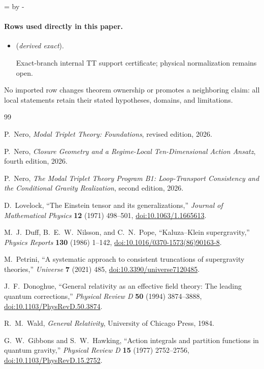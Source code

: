 \documentclass[11pt,a4paper]{article}
\theoremstyle{definition}
\theoremstyle{remark}
\begin{document}
\par\begingroup{}=\pagegoal\advance{} by -\pagetotal\ifdim\dimen0<7\baselineskip\newpage\fi\endgroup
\paragraph{Rows used directly in this paper.}
\begin{itemize}
\setlength{\itemsep}{0.25em}
\item {} (\emph{derived exact}).\par Exact-branch internal TT support certificate; physical normalization remains open.
\end{itemize}

No imported row changes theorem ownership or promotes a neighboring claim: all local statements retain their stated hypotheses, domains, and limitations.

\begin{thebibliography}{99}

P.~Nero,
\emph{Modal Triplet Theory: Foundations},
revised edition, 2026.

P.~Nero,
\emph{Closure Geometry and a Regime-Local Ten-Dimensional Action Ansatz},
fourth edition, 2026.

P.~Nero,
\emph{The Modal Triplet Theory Program B1: Loop-Transport Consistency and
the Conditional Gravity Realization},
second edition, 2026.

D.~Lovelock,
``The Einstein tensor and its generalizations,''
\emph{Journal of Mathematical Physics} \textbf{12} (1971) 498--501,
\href{https://doi.org/10.1063/1.1665613}
{doi:10.1063/1.1665613}.

M.~J.~Duff, B.~E.~W.~Nilsson, and C.~N.~Pope,
``Kaluza--Klein supergravity,''
\emph{Physics Reports} \textbf{130} (1986) 1--142,
\href{https://doi.org/10.1016/0370-1573(86)90163-8}
{doi:10.1016/0370-1573(86)90163-8}.

M.~Petrini,
``A systematic approach to consistent truncations of supergravity
theories,''
\emph{Universe} \textbf{7} (2021) 485,
\href{https://doi.org/10.3390/universe7120485}
{doi:10.3390/universe7120485}.

J.~F.~Donoghue,
``General relativity as an effective field theory: The leading quantum
corrections,''
\emph{Physical Review D} \textbf{50} (1994) 3874--3888,
\href{https://doi.org/10.1103/PhysRevD.50.3874}
{doi:10.1103/PhysRevD.50.3874}.

R.~M.~Wald,
\emph{General Relativity},
University of Chicago Press, 1984.

G.~W.~Gibbons and S.~W.~Hawking,
``Action integrals and partition functions in quantum gravity,''
\emph{Physical Review D} \textbf{15} (1977) 2752--2756,
\href{https://doi.org/10.1103/PhysRevD.15.2752}
{doi:10.1103/PhysRevD.15.2752}.

\end{thebibliography}
\end{document}
